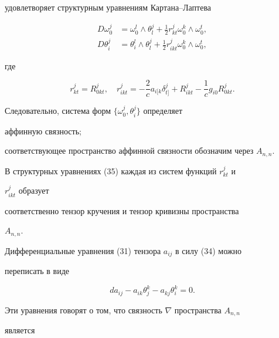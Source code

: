 удовлетворяет структурным уравнениям Картана--Лаптева 


\begin{equation}


\begin{split} 


D\omega^j_0&=\omega^l_0\wedge \theta^j_l+\frac{1}{2} 


r^j_{kt}\omega^k_0\wedge\omega^t_0, \\ 


% 


D\theta^j_i&=\theta^l_i\wedge \theta^j_l+\frac{1}{2} 


r^j_{ikt}\omega^k_0\wedge\omega^t_0,


\end{split} 


\end{equation}


где 


\begin{equation} 


r^j_{kt}=R^j_{0kt},\quad r^j_{ikt}=-\frac{2}{c} 


a{}_{i[k}\delta{}^j_{t]}+R^j_{ikt}-\frac{1}{c} 


g_{i0}R^j_{0kt}. 


\end{equation} 


Следовательно, система форм $\{\omega^j_0,\theta^j_i\}$ определяет 


аффинную связность; 


соответствующее пространство аффинной связности обозначим через $A_{n,n}$. 


В структурных уравнениях (35) каждая из систем функций $r^j_{kt}$ и 


$r^j_{ikt}$ образует 


соответственно тензор кручения и тензор кривизны пространства 


$A_{n,n}$. 


 


Дифференциальные уравнения (31) тензора $a_{ij}$ в силу (34) можно 


переписать в виде 


$$ 


da_{ij}-a_{ik}\theta^k_j-a_{kj}\theta^k_i=0. 


$$ 


Эти уравнения говорят о том, что связность $\nabla$ пространства $A_{n,n}$ 


является 



